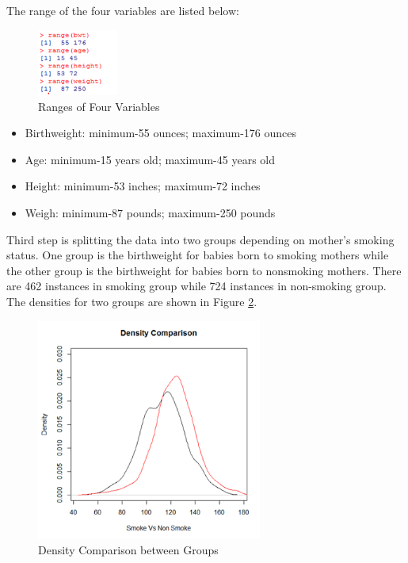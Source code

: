 \documentclass[oneside,12pt]{report}
\begin{document}
The range of the four variables are listed below:\\
\begin{figure}[htb]
    \begin{center}
        \includegraphics[width=0.237\textwidth]{range.png}
    \end{center}
    \caption{Ranges of Four Variables}
    \label{fig:range}
\end{figure}
\begin{itemize}
    \item Birthweight: minimum-55 ounces; maximum-176 ounces
    \item Age: minimum-15 years old; maximum-45 years old
    \item Height: minimum-53 inches; maximum-72 inches
    \item Weigh: minimum-87 pounds; maximum-250 pounds
\end{itemize}


Third step is splitting the data into two groups depending on mother's smoking status. One group is the birthweight for babies born to smoking mothers while the other group is the birthweight for babies born to nonsmoking mothers. There are 462 instances in smoking group while 724 instances in non-smoking group. The densities for two groups are shown in Figure \ref{fig:groupdensity}.
\begin{figure}[htb]
    \begin{center}
        \includegraphics[width=0.66\textwidth]{groupdensity.png}
    \end{center}
    \caption{Density Comparison between Groups}
    \label{fig:groupdensity}
\end{figure}
\end{document}
